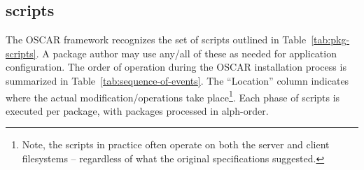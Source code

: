 \subsection{scripts}
\label{sect:pkg-scripts}

The OSCAR framework recognizes the set of scripts outlined in
Table~\ref{tab:pkg-scripts}.  A package author may use any/all of these as
needed for application configuration.  The order of operation during the
OSCAR installation process is summarized in
Table~\ref{tab:sequence-of-events}.  The ``Location'' column indicates
where the actual modification/operations take place\footnote{Note, the
 scripts in practice often operate on both the server
and client filesystems -- regardless of what the original specifications
suggested.}.  Each phase of scripts is executed per package, with packages 
processed in alph-order. 





